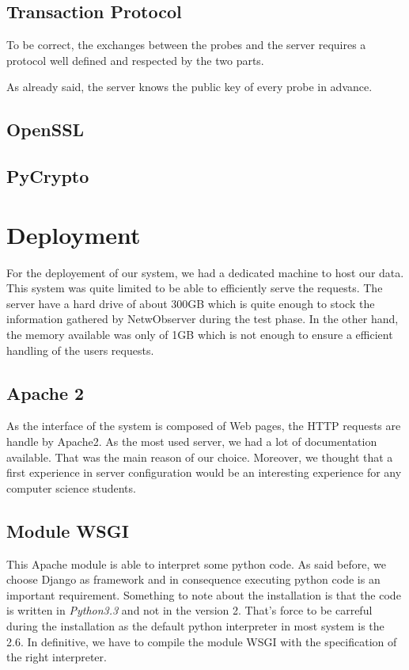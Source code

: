 \subsection{Transaction Protocol}
To be correct, the exchanges between the probes and the server requires a protocol well defined and respected by the two parts. 



As already said, the server knows the public key of every probe in advance. 



\subsection{OpenSSL}

\subsection{PyCrypto}

\section{Deployment}
For the deployement of our system, we had a dedicated machine to host our data. This system was quite limited to be able to efficiently serve the requests. The server have a hard drive of about 300GB which is quite enough to stock the information gathered by NetwObserver during the test phase. In the other hand, the memory available was only of 1GB which is not enough to ensure a efficient handling of the users requests.

\subsection{Apache 2}
As the interface of the system is composed of Web pages, the HTTP requests are handle by Apache2. As the most used server, we had a lot of documentation available. That was the main reason of our choice. Moreover, we thought that a first experience in server configuration would be an interesting experience for any computer science students.

\subsection{Module WSGI}
This Apache module is able to interpret some python code. As said before, we choose Django as framework and in consequence executing python code is an important requirement. Something to note about the installation is that the code is written in \emph{Python3.3} and not in the version 2. That's force to be carreful during the installation as the default python interpreter in most system is the 2.6. In definitive, we have to compile the module WSGI with the specification of the right interpreter.

